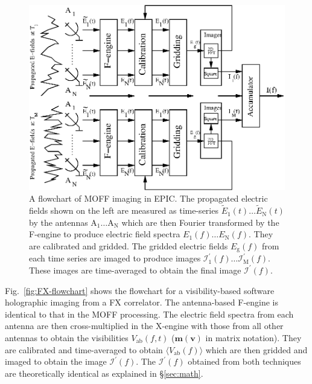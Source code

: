 \documentclass[a4paper,fleqn,usenatbib]{mnras}
\begin{document}
\begin{figure}
  \includegraphics[width=\columnwidth]{figure1}
  \caption{A flowchart of MOFF imaging in EPIC. The propagated electric fields shown on the left are measured as time-series $\widetilde{E}_1(t)\ldots \widetilde{E}_\textrm{N}(t)$ by the antennas $\textrm{A}_1\ldots \textrm{A}_\textrm{N}$ which are then Fourier transformed by the F-engine to produce electric field spectra $E_1(f)\ldots E_\textrm{N}(f)$. They are calibrated and gridded. The gridded electric fields $E_\textrm{g}(f)$ from each time series are imaged to produce images $\mathcal{I}^\prime_1(f)\ldots \mathcal{I}^\prime_\textrm{M}(f)$. These images are time-averaged to obtain the final image $\mathcal{I}^\prime(f)$.}
  \label{fig:MOFF-flowchart}
\end{figure}

Fig.~\ref{fig:FX-flowchart} shows the flowchart for a visibility-based software holographic imaging from a FX correlator. The antenna-based F-engine is identical to that in the MOFF processing. The electric field spectra from each antenna are then cross-multiplied in the X-engine with those from all other antennas to obtain the visibilities $V_\textrm{ab}(f,t)$ ($\mathbf{m}(\mathbf{v})$ in matrix notation). They are calibrated and time-averaged to obtain $\langle V_\textrm{ab}(f)\rangle$ which are then gridded and imaged to obtain the image $\mathcal{I}^\prime(f)$. The $\mathcal{I}^\prime(f)$ obtained from both techniques are theoretically identical as explained in \S\ref{sec:math}.
\end{document}
